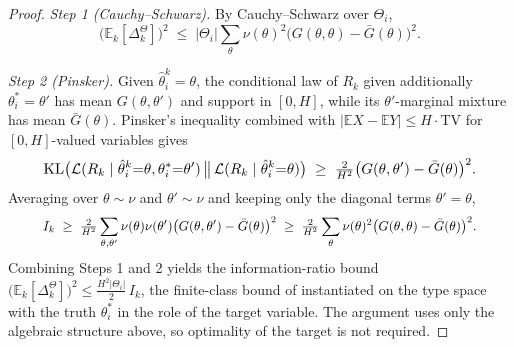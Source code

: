 \begin{proof}
\emph{Step 1 (Cauchy--Schwarz).} By Cauchy--Schwarz over $\Theta_i$,
\begin{equation*}
\big(\mathbb{E}_k[\Delta_k^\Theta]\big)^2 \;\le\; |\Theta_i| \sum_\theta \nu(\theta)^2 \big(G(\theta,\theta) - \bar G(\theta)\big)^2.
\end{equation*}

\emph{Step 2 (Pinsker).} Given $\hat\theta_i^k = \theta$, the conditional law of $R_k$ given additionally $\theta_i^* = \theta'$ has mean $G(\theta,\theta')$ and support in $[0,H]$, while its $\theta'$-marginal mixture has mean $\bar G(\theta)$. Pinsker's inequality combined with $|\mathbb{E} X - \mathbb{E} Y| \le H\cdot\mathrm{TV}$ for $[0,H]$-valued variables gives
\begin{equation*}\resizebox{0.9\linewidth}{!}{$\displaystyle \mathrm{KL}\big(\mathcal L(R_k \mid \hat\theta_i^k{=}\theta, \theta_i^*{=}\theta') \,\big\|\, \mathcal L(R_k \mid \hat\theta_i^k{=}\theta)\big) \;\ge\; \tfrac{2}{H^2}\big(G(\theta,\theta') - \bar G(\theta)\big)^2. $}\end{equation*}
Averaging over $\theta \sim \nu$ and $\theta' \sim \nu$ and keeping only the diagonal terms $\theta' = \theta$,
\begin{equation*}\resizebox{0.9\linewidth}{!}{$\displaystyle I_k \;\ge\; \tfrac{2}{H^2}\sum_{\theta,\theta'} \nu(\theta)\nu(\theta') \big(G(\theta,\theta') - \bar G(\theta)\big)^2 \;\ge\; \tfrac{2}{H^2} \sum_\theta \nu(\theta)^2 \big(G(\theta,\theta) - \bar G(\theta)\big)^2. $}\end{equation*}
Combining Steps 1 and 2 yields the information-ratio bound $\big(\mathbb{E}_k[\Delta_k^\Theta]\big)^2 \le \tfrac{H^2 |\Theta_i|}{2}\, I_k$, the finite-class bound of \citet{russo2016information} instantiated on the type space with the truth $\theta_i^*$ in the role of the target variable. The argument uses only the algebraic structure above, so optimality of the target is not required.


\end{proof}
